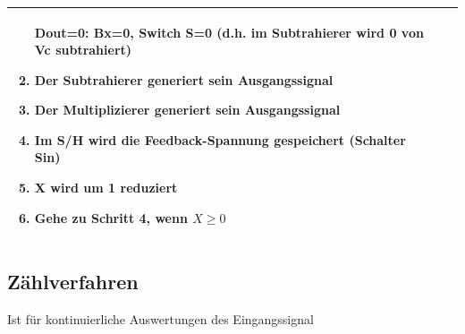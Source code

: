 \begin{longtable}{|l|l|l|}
\begin{minipage}{8cm}
\begin{enumerate}
  Dout=0: Bx=0, Switch S=0 (d.h. im Subtrahierer wird 0 von Vc
  subtrahiert)
  \item Der Subtrahierer generiert sein Ausgangssignal
  \item Der Multiplizierer generiert sein Ausgangssignal
  \item Im S/H wird die Feedback-Spannung gespeichert (Schalter Sin)
  \item X wird um 1 reduziert
  \item Gehe zu Schritt 4, wenn $X\geq0$
\end{enumerate}
\end{minipage}
\\
\hline
\end{longtable}



\subsection{Zählverfahren} 
Ist für kontinuierliche Auswertungen des Eingangssignal
